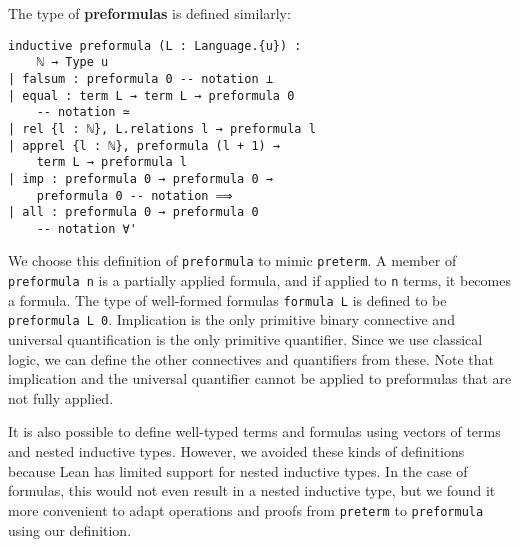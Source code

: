 \documentclass[sigplan,screen]{acmart}
\newcommand{\lil}{\lstinline}
\theoremstyle{definition}
\begin{document}
The type of \textbf{preformulas} is defined similarly:
\begin{lstlisting}
inductive preformula (L : Language.{u}) :
    ℕ → Type u
| falsum : preformula 0 -- notation ⊥
| equal : term L → term L → preformula 0
    -- notation ≃
| rel {l : ℕ}, L.relations l → preformula l
| apprel {l : ℕ}, preformula (l + 1) →
    term L → preformula l
| imp : preformula 0 → preformula 0 →
    preformula 0 -- notation ⟹
| all : preformula 0 → preformula 0
    -- notation ∀'
\end{lstlisting}
We choose this definition of \lil{preformula} to mimic \lil{preterm}.
A member of \lil{preformula n} is a partially applied formula, and if applied to \lil{n} terms, it becomes a formula.
The type of well-formed formulas \lil{formula L} is defined to be \lil{preformula L 0}.
Implication is the only primitive binary connective and universal quantification is the only primitive quantifier. Since we use classical logic, we can define the other connectives and quantifiers from these.
Note that implication and the universal quantifier cannot be applied to preformulas that are not fully applied.

It is also possible to define well-typed terms and formulas using vectors of terms and nested inductive types. However, we avoided these kinds of definitions because Lean has limited support for nested inductive types. In the case of formulas, this would not even result in a nested inductive type, but we found it more convenient to adapt operations and proofs from \lil{preterm} to \lil{preformula} using our definition.
\end{document}
